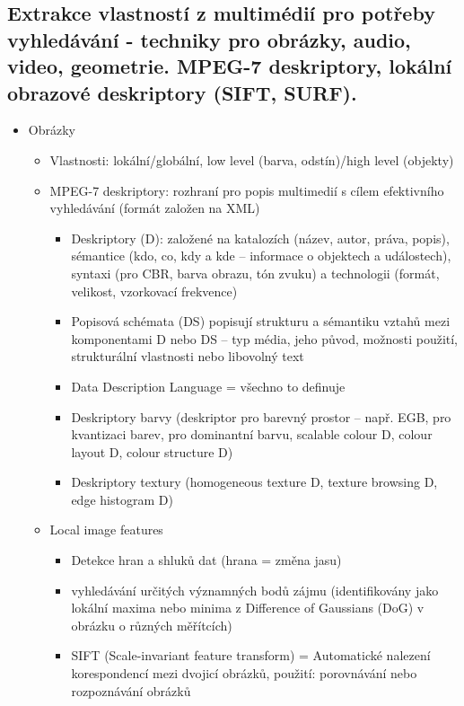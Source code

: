 \documentclass[a4paper,hidelinks]{article}
\begin{document}
\subsection{Extrakce vlastností z multimédií pro potřeby vyhledávání - techniky pro obrázky, audio, video, geometrie. MPEG-7 deskriptory, lokální obrazové deskriptory (SIFT, SURF).}

\begin{itemize}
    \item Obrázky
    \begin{itemize}
        \item Vlastnosti: lokální/globální, low level (barva, odstín)/high level (objekty)
        \item MPEG-7 deskriptory: rozhraní pro popis multimedií s cílem efektivního vyhledávání (formát založen na XML)
        \begin{itemize}
            \item Deskriptory (D): založené na katalozích (název, autor, práva, popis), sémantice (kdo, co, kdy a kde – informace o objektech a událostech), syntaxi (pro CBR, barva obrazu, tón zvuku) a technologii (formát, velikost, vzorkovací frekvence)
            \item Popisová schémata (DS) popisují strukturu a sémantiku vztahů mezi komponentami D nebo DS – typ média, jeho původ, možnosti použití, strukturální vlastnosti nebo libovolný text
            \item Data Description Language = všechno to definuje
            \item Deskriptory barvy (deskriptor pro barevný prostor -- např. EGB, pro kvantizaci barev, pro dominantní barvu, scalable colour D, colour layout D, colour structure D)
            \item Deskriptory textury (homogeneous texture D, texture browsing D, edge histogram D)
        \end{itemize}
        \item Local image features
        \begin{itemize}
            \item Detekce hran a shluků dat (hrana = změna jasu)
            \item vyhledávání určitých významných bodů zájmu (identifikovány jako lokální maxima nebo minima z Difference of Gaussians (DoG) v obrázku o různých měřítcích)
            \item SIFT (Scale-invariant feature transform) = Automatické nalezení korespondencí mezi dvojicí obrázků, použití: porovnávání nebo rozpoznávání obrázků

\end{itemize}
\end{itemize}
\end{itemize}
\end{document}
